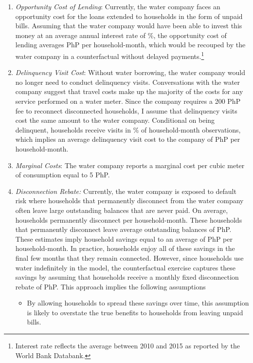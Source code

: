 \documentclass[12pt]{article}
\begin{document}
\begin{enumerate}
\item \textit{Opportunity Cost of Lending}: Currently, the water company faces an opportunity cost for the loans extended to households in the form of unpaid bills.  Assuming that the water company would have been able to invest this money at an average annual interest rate of \unskip\%, the opportunity cost of lending averages PhP per household-month, which would be recouped by the water company in a counterfactual without delayed payments.\footnote{Interest rate reflects the average between 2010 and 2015 as reported by the World Bank Databank.}

\item \textit{Delinquency Visit Cost}: Without water borrowing, the water company would no longer need to conduct delinquency visits.  Conversations with the water company suggest that travel costs make up the majority of the costs for any service performed on a water meter.  Since the company requires a 200 PhP fee to reconnect disconnected households, I assume that delinquency visits cost the same amount to the water company.  Conditional on being delinquent, households receive visits in \unskip\% of household-month observations, which implies an average delinquency visit cost to the company of PhP per household-month. 

\item \textit{Marginal Costs}: The water company reports a marginal cost per cubic meter of consumption equal to 5 PhP.

\item \textit{Disconnection Rebate:}  Currently, the water company is exposed to default risk where households that permanently disconnect from the water company often leave large outstanding balances that are never paid.  On average, households permanently disconnect per household-month.  These households that permanently disconnect leave average outstanding balances of PhP.  These estimates imply household savings equal to an average of PhP per household-month.  In practice, households enjoy all of these savings in the final few months that they remain connected.  However, since households use water indefinitely in the model, the counterfactual exercise captures these savings by assuming that households receive a monthly fixed disconnection rebate of PhP.  This approach implies the following assumptions
\begin{itemize}
    \item By allowing households to spread these savings over time, this assumption is likely to overstate the true benefits to households from leaving unpaid bills. 


\end{itemize}
\end{enumerate}
\end{document}
